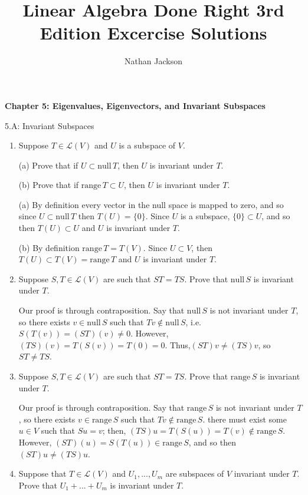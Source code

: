 \documentclass{book}
\title{Linear Algebra Done Right 3rd Edition Excercise Solutions}
\author{Nathan Jackson}
\begin{document}
\textbf{Chapter 5: Eigenvalues, Eigenvectors, and Invariant Subspaces}

5.A: Invariant Subspaces

\begin{enumerate}

\item Suppose \(T \in \mathcal{L}(V)\) and \(U\) is a subspace of \(V\).

(a) Prove that if \(U \subset \textrm{null} \, T\), then \(U\) is invariant under \(T\).

(b) Prove that if \(\textrm{range} \, T \subset U\), then \(U\) is invariant under \(T\).

(a) By definition every vector in the null space is mapped to zero, and so since \(U \subset \textrm{null} \, T\) then \(T(U)=\{0\}\).  Since \(U\) is a subspace, \(\{0\} \subset U\), and so then \(T(U) \subset U\) and \(U\) is invariant under \(T\).

(b) By definition \(\textrm{range} \, T=T(V)\).  Since \(U \subset V\), then \(T(U) \subset T(V) = \textrm{range} \, T\) and \(U\) is invariant under \(T\).

\item Suppose \(S,T \in \mathcal{L}(V)\) are such that \(ST=TS\).  Prove that \(\textrm{null} \, S\) is invariant under \(T\).

Our proof is through contraposition.  Say that \(\textrm{null} \, S\) is not invariant under \(T\), so there exists \(v \in \textrm{null} \, S\) such that \(Tv \notin \textrm{null} \, S\), i.e. \(S(T(v))=(ST)(v) \neq 0\).  However, \((TS)(v)=T(S(v))=T(0)=0\).  Thus,\((ST)v \neq (TS)v\), so \(ST \neq TS\).

\item Suppose \(S,T \in \mathcal{L}(V)\) are such that \(ST=TS\).  Prove that \(\textrm{range} \, S\) is invariant under \(T\).

Our proof is through contraposition.  Say that \(\textrm{range} \, S\) is not invariant under \(T\), so there exists \(v \in \textrm{range} \, S\) such that \(Tv \notin \textrm{range} \, S\).  there must exist some \(u \in V\) such that \(Su=v\); then, \((TS)u=T(S(u))=T(v) \notin \textrm{range} \, S\).  However, \((ST)(u)=S(T(u)) \in \textrm{range} \, S\), and so then \((ST)u \neq (TS)u\).

\item Suppose that \(T \in \mathcal{L}(V)\) and \(U_1, ..., U_m\) are subspaces of \(V\) invariant under \(T\).  Prove that \(U_1 + ... + U_m\) is invariant under \(T\).


\end{enumerate}
\end{document}
